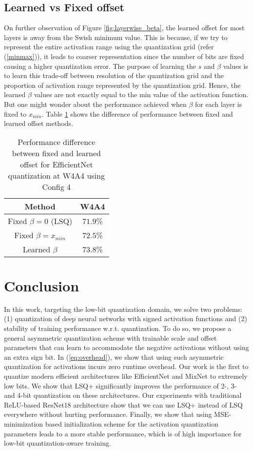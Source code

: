 \documentclass[10pt,twocolumn,letterpaper]{article}
\begin{document}
\subsection{Learned vs Fixed offset}
On further observation of Figure \ref{fig:layerwise_beta}, the learned offset for most layers is away from the Swish minimum value. This is because, if we try to represent the entire activation range using the quantization grid (refer (\ref{minmax})), it leads to coarser representation since the number of bits are fixed causing a higher quantization error. The purpose of learning the $s$ and $\beta$ values is to learn this trade-off between resolution of the quantization grid and the proportion of activation range represented by the quantization grid. Hence, the learned $\beta$ values are not exactly equal to the min value of the activation function. But one might wonder about the performance achieved when $\beta$ for each layer is fixed to $x_{min}$. Table \ref{table:fixed_offset} shows the difference of performance between fixed and learned offset methods.
\begin{table}[t]
	\caption{Performance difference between fixed and learned offset for EfficientNet quantization at W4A4 using Config 4}
	\centering
	\begin{tabular}{c| c }
        \toprule
        	Method & {W4A4} \\
			
			\midrule
			Fixed $\beta=0$ (LSQ) & $71.9$\% \\
			Fixed $\beta=x_{min}$ & $72.5$\% \\
			Learned $\beta$ & $73.8$\% \\
        \bottomrule
	\end{tabular}
	\label{table:fixed_offset}
\end{table}




\section{Conclusion}
In this work, targeting the low-bit quantization domain, we solve two problems: (1) quantization of deep neural networks with signed activation functions and (2) stability of training performance w.r.t. quantization. To do so, we propose a general asymmetric quantization scheme with trainable scale and offset parameters that can learn to accommodate the negative activations without using an extra sign bit. In (\ref{eq:overhead}), we show that using such asymmetric quantization for activations incurs zero runtime overhead. Our work is the first to quantize modern efficient architectures like EfficientNet and MixNet to extremely low bits. We show that LSQ+ significantly improves the performance of 2-, 3- and 4-bit quantization on these architectures. Our experiments with traditional ReLU-based ResNet18 architecture show that we can use LSQ+ instead of LSQ everywhere without hurting performance. Finally, we show that using MSE-minimization based initialization scheme for the activation quantization parameters leads to a more stable performance, which is of high importance for low-bit quantization-aware training.


{\small


}
\end{document}
